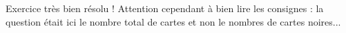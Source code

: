 Exercice très bien résolu !
Attention cependant à bien lire les consignes : la question était ici le nombre total de cartes et non le nombres de cartes noires...